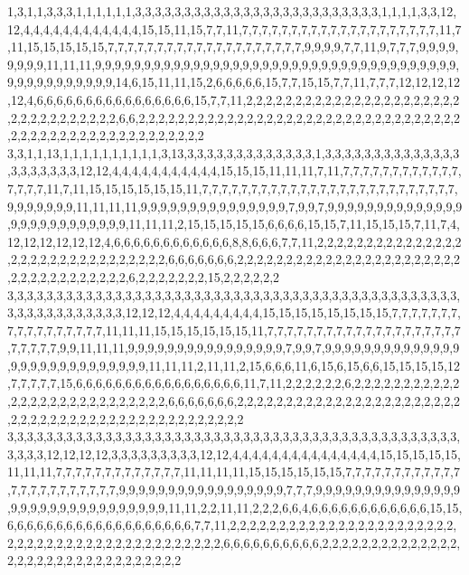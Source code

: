 1,3,1,1,3,3,3,1,1,1,1,1,1,3,3,3,3,3,3,3,3,3,3,3,3,3,3,3,3,3,3,3,3,3,3,3,3,3,1,1,1,1,3,3,12,12,4,4,4,4,4,4,4,4,4,4,4,4,15,15,11,15,7,7,11,7,7,7,7,7,7,7,7,7,7,7,7,7,7,7,7,7,7,7,7,11,7,11,15,15,15,15,15,7,7,7,7,7,7,7,7,7,7,7,7,7,7,7,7,7,7,7,7,9,9,9,9,7,7,11,9,7,7,7,9,9,9,9,9,9,9,9,11,11,11,9,9,9,9,9,9,9,9,9,9,9,9,9,9,9,9,9,9,9,9,9,9,9,9,9,9,9,9,9,9,9,9,9,9,9,9,9,9,9,9,9,9,9,9,9,9,9,9,14,6,15,11,11,15,2,6,6,6,6,6,15,7,7,15,15,7,7,11,7,7,7,12,12,12,12,12,4,6,6,6,6,6,6,6,6,6,6,6,6,6,6,6,6,15,7,7,11,2,2,2,2,2,2,2,2,2,2,2,2,2,2,2,2,2,2,2,2,2,2,2,2,2,2,2,2,2,2,2,2,2,6,6,2,2,2,2,2,2,2,2,2,2,2,2,2,2,2,2,2,2,2,2,2,2,2,2,2,2,2,2,2,2,2,2,2,2,2,2,2,2,2,2,2,2,2,2,2,2,2,2,2,2,2,2,2
3,3,1,1,13,1,1,1,1,1,1,1,1,1,1,3,13,3,3,3,3,3,3,3,3,3,3,3,3,3,1,3,3,3,3,3,3,3,3,3,3,3,3,3,3,3,3,3,3,3,3,3,12,12,4,4,4,4,4,4,4,4,4,4,4,15,15,15,11,11,11,7,11,7,7,7,7,7,7,7,7,7,7,7,7,7,7,7,7,11,7,11,15,15,15,15,15,15,11,7,7,7,7,7,7,7,7,7,7,7,7,7,7,7,7,7,7,7,7,7,7,7,7,7,7,9,9,9,9,9,9,9,11,11,11,11,9,9,9,9,9,9,9,9,9,9,9,9,9,9,9,7,9,9,7,9,9,9,9,9,9,9,9,9,9,9,9,9,9,9,9,9,9,9,9,9,9,9,9,9,9,11,11,11,2,15,15,15,15,15,6,6,6,6,15,15,7,11,15,15,15,7,11,7,4,12,12,12,12,12,12,4,6,6,6,6,6,6,6,6,6,6,6,6,8,8,6,6,6,7,7,11,2,2,2,2,2,2,2,2,2,2,2,2,2,2,2,2,2,2,2,2,2,2,2,2,2,2,2,2,2,2,2,6,6,6,6,6,6,6,2,2,2,2,2,2,2,2,2,2,2,2,2,2,2,2,2,2,2,2,2,2,2,2,2,2,2,2,2,2,2,2,2,2,2,6,2,2,2,2,2,2,2,15,2,2,2,2,2,2
3,3,3,3,3,3,3,3,3,3,3,3,3,3,3,3,3,3,3,3,3,3,3,3,3,3,3,3,3,3,3,3,3,3,3,3,3,3,3,3,3,3,3,3,3,3,3,3,3,3,3,3,3,3,3,3,3,3,12,12,12,4,4,4,4,4,4,4,4,4,15,15,15,15,15,15,15,15,7,7,7,7,7,7,7,7,7,7,7,7,7,7,7,7,7,11,11,11,15,15,15,15,15,15,11,7,7,7,7,7,7,7,7,7,7,7,7,7,7,7,7,7,7,7,7,7,7,7,7,7,9,9,11,11,11,9,9,9,9,9,9,9,9,9,9,9,9,9,9,9,9,7,9,9,7,9,9,9,9,9,9,9,9,9,9,9,9,9,9,9,9,9,9,9,9,9,9,9,9,9,9,9,9,11,11,11,2,11,11,2,15,6,6,6,11,6,15,6,15,6,6,15,15,15,15,12,7,7,7,7,7,15,6,6,6,6,6,6,6,6,6,6,6,6,6,6,6,6,6,11,7,11,2,2,2,2,2,2,6,2,2,2,2,2,2,2,2,2,2,2,2,2,2,2,2,2,2,2,2,2,2,2,2,2,2,2,6,6,6,6,6,6,6,2,2,2,2,2,2,2,2,2,2,2,2,2,2,2,2,2,2,2,2,2,2,2,2,2,2,2,2,2,2,2,2,2,2,2,2,2,2,2,2,2,2,2,2,2,2,2
3,3,3,3,3,3,3,3,3,3,3,3,3,3,3,3,3,3,3,3,3,3,3,3,3,3,3,3,3,3,3,3,3,3,3,3,3,3,3,3,3,3,3,3,3,3,3,3,3,3,12,12,12,12,3,3,3,3,3,3,3,3,3,12,12,4,4,4,4,4,4,4,4,4,4,4,4,4,4,4,15,15,15,15,15,11,11,11,7,7,7,7,7,7,7,7,7,7,7,7,7,11,11,11,11,15,15,15,15,15,15,7,7,7,7,7,7,7,7,7,7,7,7,7,7,7,7,7,7,7,7,7,7,7,9,9,9,9,9,9,9,9,9,9,9,9,9,9,9,9,9,7,7,7,9,9,9,9,9,9,9,9,9,9,9,9,9,9,9,9,9,9,9,9,9,9,9,9,9,9,9,9,9,9,9,11,11,2,2,11,11,2,2,2,6,6,4,6,6,6,6,6,6,6,6,6,6,6,6,15,15,6,6,6,6,6,6,6,6,6,6,6,6,6,6,6,6,6,6,6,7,7,11,2,2,2,2,2,2,2,2,2,2,2,2,2,2,2,2,2,2,2,2,2,2,2,2,2,2,2,2,2,2,2,2,2,2,2,2,2,2,2,2,2,2,2,2,2,6,6,6,6,6,6,6,6,6,6,2,2,2,2,2,2,2,2,2,2,2,2,2,2,2,2,2,2,2,2,2,2,2,2,2,2,2,2,2,2,2,2
